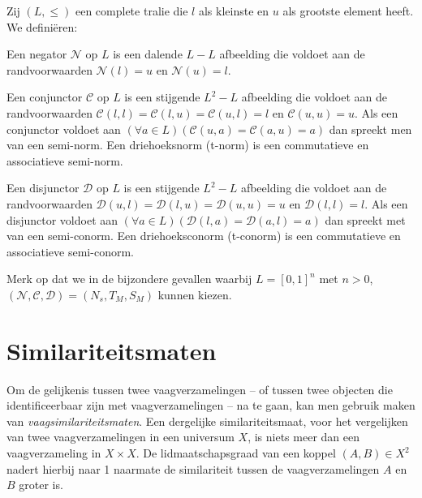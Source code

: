 Zij $(L,\le)$ een complete tralie die $l$ als kleinste en $u$ als grootste element heeft. We
defini\"eren:
\begin{definitie}
Een negator $\mathcal{N}$ op $L$ is een dalende $L - L$ afbeelding die voldoet
aan de randvoorwaarden $\mathcal{N}(l)=u$ en $\mathcal{N}(u)=l$. 
\end{definitie}
\begin{definitie}
Een conjunctor $\mathcal{C}$ op $L$ is een stijgende $L^2 - L$ afbeelding die voldoet aan de
randvoorwaarden $\mathcal{C}(l,l)=\mathcal{C}(l,u)=\mathcal{C}(u,l)=l$ en $\mathcal{C}(u,u)=u$. 
Als een conjunctor voldoet aan 
$(\forall a \in L)(\mathcal{C}(u,a)=\mathcal{C}(a,u)=a)$ dan spreekt men van een semi-norm.
Een driehoeksnorm (t-norm) is een commutatieve en associatieve semi-norm.
\end{definitie}
\begin{definitie}
Een disjunctor $\mathcal{D}$ op $L$ is een stijgende $L^2 - L$ afbeelding die voldoet
aan de randvoorwaarden $\mathcal{D}(u,l)=\mathcal{D}(l,u)=\mathcal{D}(u,u)=u$ en 
$\mathcal{D}(l,l)=l$. Als een disjunctor voldoet aan 
$(\forall a \in L)(\mathcal{D}(l,a)=\mathcal{D}(a,l)=a)$ dan spreekt met van een semi-conorm.
Een driehoeksconorm (t-conorm) is een commutatieve en associatieve semi-conorm.
\end{definitie}

Merk op dat we in de bijzondere gevallen waarbij $L=[0,1]^n$ met $n > 0$, 
$(\mathcal{N},\mathcal{C},\mathcal{D})=(N_s,T_M,S_M)$ kunnen kiezen.


\section{Similariteitsmaten}

Om de gelijkenis tussen twee vaagverzamelingen -- of tussen twee objecten die identificeerbaar 
zijn met vaagverzamelingen -- na te gaan, kan men gebruik maken van \emph{vaagsimilariteitsmaten}. 
Een dergelijke similariteitsmaat, voor het vergelijken van twee vaagverzamelingen in een 
universum $X$, is niets meer dan een vaagverzameling in $X \times X$. De lidmaatschapsgraad van 
een koppel $(A,B) \in X^2$ nadert hierbij naar 1 naarmate de similariteit tussen de 
vaagverzamelingen $A$ en $B$ groter is.

